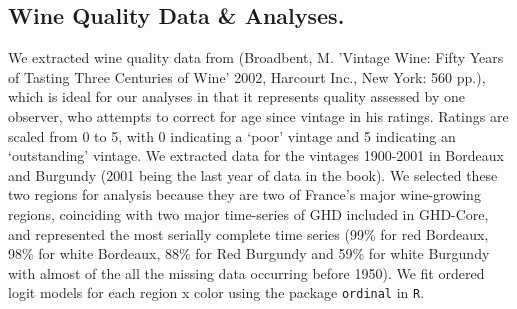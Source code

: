 \documentclass[final]{nature}
\begin{document}
\begin{methods}
\subsection{Wine Quality Data \& Analyses.}
We extracted wine quality data from (Broadbent, M. 'Vintage Wine: Fifty Years of Tasting Three Centuries of Wine' 2002, Harcourt Inc., New York: 560 pp.), which is ideal for our analyses in that it represents quality assessed by one observer, who attempts to correct for age since vintage in his ratings. Ratings are scaled from 0 to 5, with 0 indicating a `poor' vintage and 5 indicating an `outstanding' vintage. We extracted data for the vintages 1900-2001 in Bordeaux and Burgundy (2001 being the last year of data in the book). We selected these two regions for analysis because they are two of France's major wine-growing regions, coinciding with two major time-series of GHD included in GHD-Core, and represented the most serially complete time series (99\% for red Bordeaux, 98\% for white Bordeaux, 88\% for Red Burgundy and 59\% for white Burgundy with almost of the all the missing data occurring before 1950). We fit ordered logit models for each region x color using the package \verb|ordinal| in \verb|R|\cite{Rcore2014}.

\end{methods}






\end{document}
